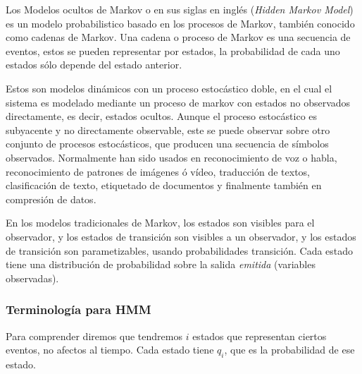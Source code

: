 


Los Modelos ocultos de Markov o en sus siglas en inglés \HMM (\emph{Hidden Markov Model})  es un modelo probabilistico basado en los procesos de Markov, también conocido como cadenas de Markov. Una cadena o proceso de Markov es una secuencia de eventos, estos se pueden representar por estados, la probabilidad de cada uno estados sólo depende del estado anterior.


Estos \HMM son modelos dinámicos con un proceso estocástico doble, en el cual el sistema es modelado mediante un proceso de markov con estados no observados directamente, es decir, estados ocultos. Aunque el proceso estocástico es subyacente y no directamente observable, este se puede observar sobre otro conjunto de procesos estocásticos, que producen una secuencia de símbolos observados. Normalmente han sido usados en reconocimiento de voz o habla, reconocimiento de patrones de imágenes ó vídeo, traducción de textos, clasificación de texto, etiquetado de documentos y finalmente también en compresión de datos.

En los modelos tradicionales de Markov, los estados son visibles para el observador, y los estados de transición son visibles a un observador, y los estados de transición son parametizables, usando probabilidades transición. Cada estado tiene una distribución de probabilidad sobre la salida \emph{emitida} (variables observadas).




\subsubsection{Terminología para HMM}

Para comprender diremos que tendremos $i$ estados que representan ciertos eventos, no afectos al tiempo. Cada estado tiene $q_{i}$, que es la probabilidad de ese estado.

